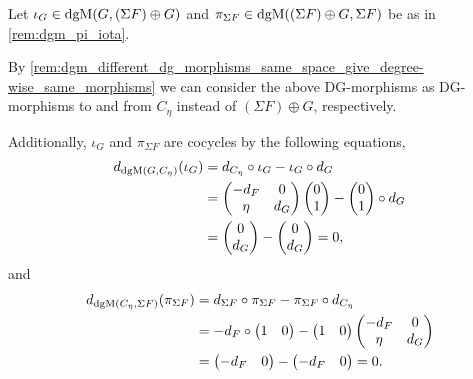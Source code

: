 \begin{remark}
    \label{rem:dgm_differentials_of_inclusions_and_projections_of_cone}
    Let \( \iota_G \in \operatorname{dgM}(G, (\Sigma F) \oplus G) \) and \( \pi_{\Sigma F} \in \operatorname{dgM}((\Sigma F) \oplus G, \Sigma F) \) be as in \autoref{rem:dgm_pi_iota}.

    By \autoref{rem:dgm_different_dg_morphisms_same_space_give_degree-wise_same_morphisms} we can consider the above DG-morphisms as DG-morphisms to and from \( C_{\eta} \) instead of \( (\Sigma F) \oplus G \), respectively.

    Additionally, \( \iota_G \) and \( \pi_{\Sigma F} \) are cocycles by the following equations,
    \begin{align*}
        d_{\operatorname{dgM}(G, C_{\eta})}(\iota_G) &= d_{C_{\eta}} \circ \iota_G - \iota_G \circ d_G \\
        &=
        \begin{pmatrix}
            -d_F & 0 \\
            \eta & d_G
        \end{pmatrix}
        \begin{pmatrix}
            0 \\
            1
        \end{pmatrix}
        -
        \begin{pmatrix}
            0 \\
            1
        \end{pmatrix}
        \circ d_G \\
        &=
        \begin{pmatrix}
            0 \\
            d_G
        \end{pmatrix}
        -
        \begin{pmatrix}
            0 \\
            d_G
        \end{pmatrix}
        = 0,
    \end{align*}
    and
    \begin{align*}
        d_{\operatorname{dgM}(C_{\eta}, \Sigma F)}(\pi_{\Sigma F}) &= d_{\Sigma F} \circ \pi_{\Sigma F} - \pi_{\Sigma F} \circ d_{C_{\eta}} \\
        &= -d_F \circ
        \begin{pmatrix}
            1 & 0
        \end{pmatrix}
        -
        \begin{pmatrix}
            1 & 0
        \end{pmatrix}
        \begin{pmatrix}
            -d_F & 0 \\
            \eta & d_G
        \end{pmatrix} \\
        &=
        \begin{pmatrix}
            -d_F & 0
        \end{pmatrix}
        -
        \begin{pmatrix}
            -d_F & 0
        \end{pmatrix}
        = 0.
    \end{align*}


\end{remark}
